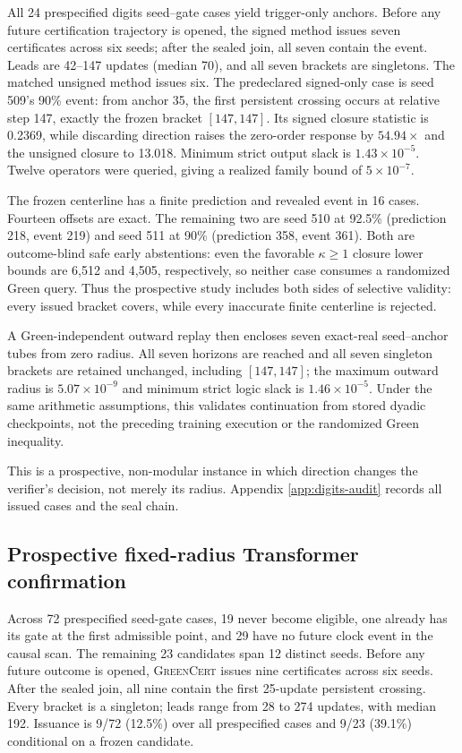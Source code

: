\documentclass{article}
\newcommand{\method}{\textsc{GreenCert}}
\begin{document}
All 24 prespecified digits seed--gate cases yield trigger-only anchors.  Before
any future certification trajectory is opened, the signed method issues seven
certificates across six seeds; after the sealed join, all seven contain the
event.  Leads are 42--147 updates (median 70), and all seven brackets are
singletons.  The matched unsigned method issues six.  The predeclared
signed-only case is seed 509's 90\% event: from anchor 35, the first persistent
crossing occurs at relative step 147, exactly the frozen bracket $[147,147]$.
Its signed closure statistic is 0.2369, while discarding direction raises the
zero-order response by $54.94\times$ and the unsigned closure to 13.018.
Minimum strict output slack is $1.43\times10^{-5}$.  Twelve operators were
queried, giving a realized family bound of $5\times10^{-7}$.

The frozen centerline has a finite prediction and revealed event in 16 cases.
Fourteen offsets are exact.  The remaining two are seed 510 at 92.5\%
(prediction 218, event 219) and seed 511 at 90\% (prediction 358, event 361).
Both are outcome-blind safe early abstentions: even the favorable
$\kappa\ge1$ closure lower bounds are 6,512 and 4,505, respectively, so neither
case consumes a randomized Green query.  Thus the prospective study includes
both sides of selective validity: every issued bracket covers, while every
inaccurate finite centerline is rejected.

A Green-independent outward replay then encloses seven exact-real
seed--anchor tubes from zero radius.  All seven horizons are reached and all
seven singleton brackets are retained unchanged, including $[147,147]$; the
maximum outward radius is $5.07\times10^{-9}$ and minimum strict logic slack
is $1.46\times10^{-5}$.  Under the same arithmetic assumptions, this validates
continuation from stored dyadic checkpoints, not the preceding training
execution or the randomized Green inequality.

This is a prospective, non-modular instance in which direction changes the
verifier's decision, not merely its radius.  Appendix
\ref{app:digits-audit} records all issued cases and the seal chain.

\subsection{Prospective fixed-radius Transformer confirmation}

Across 72 prespecified seed-gate cases, 19 never become eligible, one already
has its gate at the first admissible point, and 29 have no future clock event in
the causal scan.  The remaining 23 candidates span 12 distinct seeds.  Before
any future outcome is opened, \method{} issues nine certificates across six
seeds.  After the sealed join, all nine contain the first 25-update persistent
crossing.  Every bracket is a singleton; leads range from 28 to 274 updates,
with median 192.  Issuance is 9/72 (12.5\%) over all prespecified cases and
9/23 (39.1\%) conditional on a frozen candidate.
\end{document}
